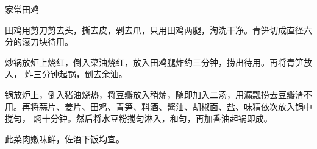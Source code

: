 \begin{recipe}{家常田鸡}

\ingredients


\preparation

\step 田鸡用剪刀剪去头，撕去皮，剁去爪，只用田鸡两腿，淘洗干净。青笋切成直径六
分的滚刀块待用。

炒锅放炉上烧红，倒入菜油烧红，放入田鸡腿炸约三分钟，捞出待用。再将青笋放入，
炸三分钟起锅，倒去余油。

\step 锅放炉上，倒入猪油烧热，将豆瓣放入稍煵，随即加入二汤，用漏瓢捞去豆瓣渣不
用。再将蒜片、姜片、田鸡、青笋、料酒、酱油、胡椒面、盐、味精依次放入锅中搅匀，
焖十分钟。然后将水豆粉搅匀淋入，和匀，再加香油起锅即成。

\features

此菜肉嫩味鲜，佐酒下饭均宜。

\end{recipe}

